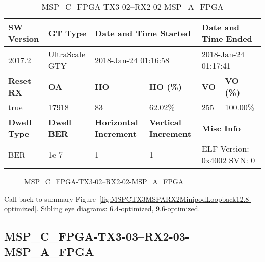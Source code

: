 \begin{table}[h]
\centering
\caption{MSP\_C\_FPGA-TX3-02--RX2-02-MSP\_A\_FPGA}
\label{tab:MSPCFPGATX302RX202MSPAFPGA12.8-optimized}
\begin{tabular}{@{}|l|l|l|l|l|l|@{}}
\toprule
\textbf{SW Version}                & \textbf{GT Type}   & \multicolumn{2}{l|}{\textbf{Date and Time Started}}            & \multicolumn{2}{l|}{\textbf{Date and Time Ended}}        \\ \midrule
2017.2                       & UltraScale GTY          & \multicolumn{2}{l|}{2018-Jan-24 01:16:58}                   & \multicolumn{2}{l|}{2018-Jan-24 01:17:41}               \\ \midrule
\textbf{Reset RX}                  & \textbf{OA} & \textbf{HO}   & \textbf{HO (\%)} & \textbf{VO} & \textbf{VO (\%)} \\ \midrule
true & 17918        & 83          & 62.02\%        & 255        & 100.00\%       \\ \midrule
\textbf{Dwell Type}                & \textbf{Dwell BER} & \textbf{Horizontal Increment} & \textbf{Vertical Increment}    & \multicolumn{2}{l|}{\textbf{Misc Info}}                  \\ \midrule
BER                            & 1e-7        & 1        & 1           & \multicolumn{2}{l|}{ELF Version: 0x4002 SVN: 0}                         \\ \bottomrule
\end{tabular}
\end{table}

\begin{figure}[h]
\caption{MSP\_C\_FPGA-TX3-02--RX2-02-MSP\_A\_FPGA} \label{fig:MSPCFPGATX302RX202MSPAFPGA12.8-optimized}
\end{figure}

Call back to summary Figure~\ref{fig:MSPCTX3MSPARX2MinipodLoopback12.8-optimized}.
Sibling eye diagrams: \hyperref[sec:MSPCFPGATX302RX202MSPAFPGA6.4-optimized]{6.4-optimized}, \hyperref[sec:MSPCFPGATX302RX202MSPAFPGA9.6-optimized]{9.6-optimized}.

\clearpage
\newpage


\subsection{MSP\_C\_FPGA-TX3-03--RX2-03-MSP\_A\_FPGA}\label{sec:MSPCFPGATX303RX203MSPAFPGA12.8-optimized}


